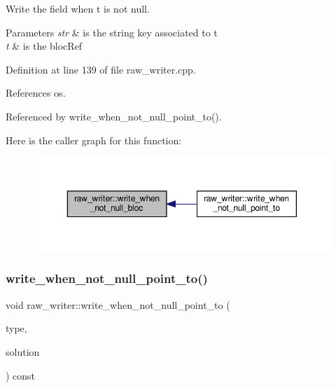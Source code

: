 Write the field when t is not null. 


\begin{DoxyParams}{Parameters}
{\em str} & is the string key associated to t \\
\hline
{\em t} & is the bloc\+Ref \\
\hline
\end{DoxyParams}


Definition at line 139 of file raw\+\_\+writer.\+cpp.



References os.



Referenced by write\+\_\+when\+\_\+not\+\_\+null\+\_\+point\+\_\+to().

Here is the caller graph for this function\+:
\nopagebreak
\begin{figure}[H]
\begin{center}
\leavevmode
\includegraphics[width=350pt]{d6/df1/structraw__writer_ad0a69a584f6faa81edfbbe6fff8a7782_icgraph}
\end{center}
\end{figure}
\mbox{\label{structraw__writer_a2f2a7a94272d8523d9e4ca3f6674ceba}} 
\subsubsection{\texorpdfstring{write\+\_\+when\+\_\+not\+\_\+null\+\_\+point\+\_\+to()}{write\_when\_not\_null\_point\_to()}}
{\footnotesize\ttfamily void raw\+\_\+writer\+::write\+\_\+when\+\_\+not\+\_\+null\+\_\+point\+\_\+to (\begin{DoxyParamCaption}\item[{const std\+::string \&}]{type,  }\item[{const \hyperlink{tree__node_8hpp_a4b5be0c528f25b8cb0b0fbc3b957d725}{Point\+To\+Solution\+Ref} \&}]{solution }\end{DoxyParamCaption}) const}



